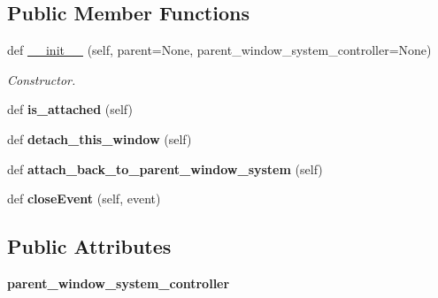 \subsection*{Public Member Functions}
\begin{DoxyCompactItemize}
\item 
def \hyperlink{classplume-creator_1_1src_1_1plume_1_1gui_1_1sub__window_1_1_sub_window_a5e8100c803f91cbe9fd6e2b4a95185cf}{\+\_\+\+\_\+init\+\_\+\+\_\+} (self, parent=None, parent\+\_\+window\+\_\+system\+\_\+controller=None)\hypertarget{classplume-creator_1_1src_1_1plume_1_1gui_1_1sub__window_1_1_sub_window_a5e8100c803f91cbe9fd6e2b4a95185cf}{}\label{classplume-creator_1_1src_1_1plume_1_1gui_1_1sub__window_1_1_sub_window_a5e8100c803f91cbe9fd6e2b4a95185cf}

\begin{DoxyCompactList}\small\item\em Constructor. \end{DoxyCompactList}\item 
def {\bfseries is\+\_\+attached} (self)\hypertarget{classplume-creator_1_1src_1_1plume_1_1gui_1_1sub__window_1_1_sub_window_a28ec6346bb005c074b96f61b8ada01ca}{}\label{classplume-creator_1_1src_1_1plume_1_1gui_1_1sub__window_1_1_sub_window_a28ec6346bb005c074b96f61b8ada01ca}

\item 
def {\bfseries detach\+\_\+this\+\_\+window} (self)\hypertarget{classplume-creator_1_1src_1_1plume_1_1gui_1_1sub__window_1_1_sub_window_a69932286251fd9f66fa5ad9a110e0365}{}\label{classplume-creator_1_1src_1_1plume_1_1gui_1_1sub__window_1_1_sub_window_a69932286251fd9f66fa5ad9a110e0365}

\item 
def {\bfseries attach\+\_\+back\+\_\+to\+\_\+parent\+\_\+window\+\_\+system} (self)\hypertarget{classplume-creator_1_1src_1_1plume_1_1gui_1_1sub__window_1_1_sub_window_ac8249c7e13f05c2513146ce68bba9959}{}\label{classplume-creator_1_1src_1_1plume_1_1gui_1_1sub__window_1_1_sub_window_ac8249c7e13f05c2513146ce68bba9959}

\item 
def {\bfseries close\+Event} (self, event)\hypertarget{classplume-creator_1_1src_1_1plume_1_1gui_1_1sub__window_1_1_sub_window_a874f9666f47bac0f70fe5a0c9073db99}{}\label{classplume-creator_1_1src_1_1plume_1_1gui_1_1sub__window_1_1_sub_window_a874f9666f47bac0f70fe5a0c9073db99}

\end{DoxyCompactItemize}
\subsection*{Public Attributes}
\begin{DoxyCompactItemize}
\item 
{\bfseries parent\+\_\+window\+\_\+system\+\_\+controller}\hypertarget{classplume-creator_1_1src_1_1plume_1_1gui_1_1sub__window_1_1_sub_window_a5b36bd158f1e65f6996c020496d93326}{}\label{classplume-creator_1_1src_1_1plume_1_1gui_1_1sub__window_1_1_sub_window_a5b36bd158f1e65f6996c020496d93326}

\end{DoxyCompactItemize}



